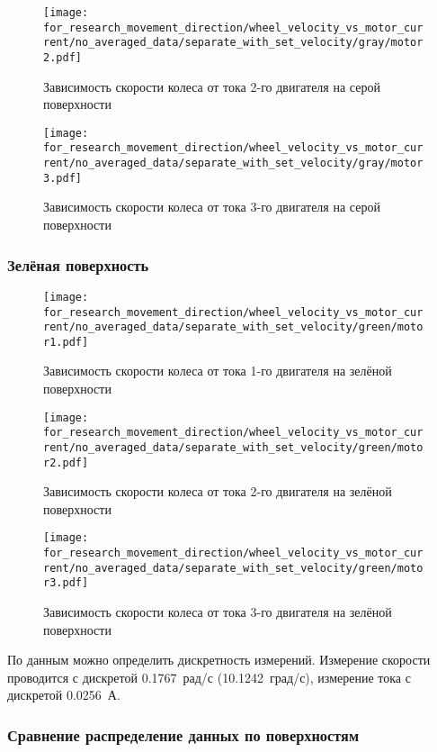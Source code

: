 \begin{figure}[H]
    \centering
    \texttt{[image: for\_research\_movement\_direction/wheel\_velocity\_vs\_motor\_current/no\_averaged\_data/separate\_with\_set\_velocity/gray/motor2.pdf]}
    \caption{Зависимость скорости колеса от тока 2-го двигателя на серой поверхности}
\end{figure}

\begin{figure}[H]
    \centering
    \texttt{[image: for\_research\_movement\_direction/wheel\_velocity\_vs\_motor\_current/no\_averaged\_data/separate\_with\_set\_velocity/gray/motor3.pdf]}
    \caption{Зависимость скорости колеса от тока 3-го двигателя на серой поверхности}
\end{figure}

\subsubsection{Зелёная поверхность}

\begin{figure}[H]
    \centering
    \texttt{[image: for\_research\_movement\_direction/wheel\_velocity\_vs\_motor\_current/no\_averaged\_data/separate\_with\_set\_velocity/green/motor1.pdf]}
    \caption{Зависимость скорости колеса от тока 1-го двигателя на зелёной поверхности}
\end{figure}

\begin{figure}[H]
    \centering
    \texttt{[image: for\_research\_movement\_direction/wheel\_velocity\_vs\_motor\_current/no\_averaged\_data/separate\_with\_set\_velocity/green/motor2.pdf]}
    \caption{Зависимость скорости колеса от тока 2-го двигателя на зелёной поверхности}
\end{figure}

\begin{figure}[H]
    \centering
    \texttt{[image: for\_research\_movement\_direction/wheel\_velocity\_vs\_motor\_current/no\_averaged\_data/separate\_with\_set\_velocity/green/motor3.pdf]}
    \caption{Зависимость скорости колеса от тока 3-го двигателя на зелёной поверхности}
\end{figure}

По данным можно определить дискретность измерений. Измерение скорости проводится с дискретой \qty{0.1767}{рад/с} (\qty{10.1242}{град/с}), измерение тока с дискретой \qty{0.0256}{А}.

\subsubsection{Сравнение распределение данных по поверхностям}

